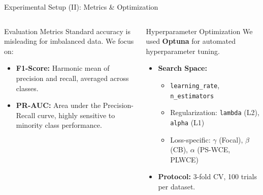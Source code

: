 \documentclass[aspectratio=169]{beamer}
\def \bblock{\begin{beamerboxesrounded}[upper=uppercolor,lower=lowercolor,shadow=true]}
\def \eblock{\end{beamerboxesrounded}}
\begin{document}
\begin{frame}{Experimental Setup (II): Metrics & Optimization}

\vspace{0.03\textwidth}

\begin{columns}[T]

  \bblock{Evaluation Metrics}
    Standard accuracy is misleading for imbalanced data. We focus on:
    \begin{itemize}
        \item \textbf{F1-Score:} Harmonic mean of precision and recall, averaged across classes.
        \item \textbf{PR-AUC:} Area under the Precision-Recall curve, highly sensitive to minority class performance.
    \end{itemize}
  \eblock

  \bblock{Hyperparameter Optimization}
    We used \textbf{Optuna} for automated hyperparameter tuning.
    \begin{itemize}
        \item \textbf{Search Space:}
        \begin{itemize}
            \item \texttt{learning\_rate}, \texttt{n\_estimators}
            \item Regularization: \texttt{lambda} (L2), \texttt{alpha} (L1)
            \item Loss-specific: $\gamma$ (Focal), $\beta$ (CB), $\alpha$ (PS-WCE, PLWCE)
        \end{itemize}
        \item \textbf{Protocol:} 3-fold CV, 100 trials per dataset.
    \end{itemize}
  \eblock

\end{columns}

\end{frame}
\end{document}
